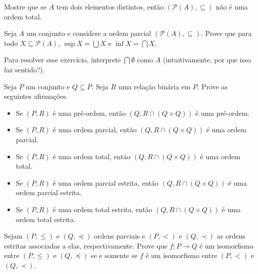\begin{exercise}[$\ZmI$]
    Mostre que se $A$ tem dois elementos distintos, então $(\mathcal{P}(A), \subseteq)$ não é uma ordem total.
\end{exercise}

\begin{exercise}[$\ZmI$]
    Seja $A$ um conjunto e considere a ordem parcial $(\mathcal{P}(A), \subseteq)$.
    Prove que para todo $X \subseteq \mathcal{P}(A)$, $\sup X = \bigcup X$ e $\inf X = \bigcap X$.

    Para resolver esse exercício, interprete $\bigcap \emptyset$ como $A$ (intuitivamente, por que isso faz sentido?).
\end{exercise}

\begin{exercise}[$\BST$]
    Seja $P$ um conjunto e $Q \subseteq P$.
    Seja $R$ uma relação binária em $P$.
    Prove as seguintes afirmações.

    \begin{itemize}
        \item Se $(P, R)$ é uma pré-ordem, então $(Q, R \cap (Q \times Q))$ é uma pré-ordem.
        \item Se $(P, R)$ é uma ordem parcial, então $(Q, R \cap (Q \times Q))$ é uma ordem parcial.
        \item Se $(P, R)$ é uma ordem total, então $(Q, R \cap (Q \times Q))$ é uma ordem total.
        \item Se $(P, R)$ é uma ordem parcial estrita, então $(Q, R \cap (Q \times Q))$ é uma ordem parcial estrita.
        \item Se $(P, R)$ é uma ordem total estrita, então $(Q, R \cap (Q \times Q))$ é uma ordem total estrita.
    \end{itemize}
\end{exercise}

\begin{exercise}[$\BST$]
    Sejam $(P, \leq)$ e $(Q, \preceq)$ ordens parciais e $(P, <)$ e $(Q, \prec)$ as ordens estritas associadas a elas, respectivamente.
    Prove que $f : P \to Q$ é um isomorfismo entre $(P, \leq)$ e $(Q, \preceq)$ se e somente se $f$ é um isomorfismo entre $(P, <)$ e $(Q, \prec)$.
\end{exercise}

